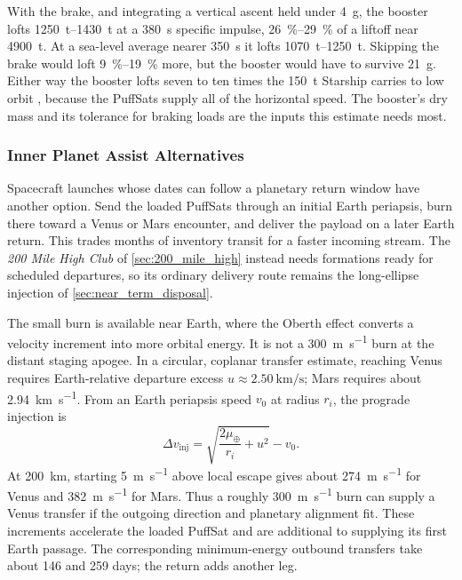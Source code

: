 \documentclass{article}
\newcommand{\deltav}{\Delta v}
\begin{document}
With the brake, and integrating a vertical ascent held under \SI{4}{g}, the booster lofts \SIrange{1250}{1430}{\tonne} at a \SI{380}{\second} specific impulse, \SIrange{26}{29}{\percent} of a liftoff near \SI{4900}{\tonne}. At a sea-level average nearer \SI{350}{\second} it lofts \SIrange{1070}{1250}{\tonne}. Skipping the brake would loft \SIrange{9}{19}{\percent} more, but the booster would have to survive \SI{21}{g}. Either way the booster lofts seven to ten times the \SI{150}{\tonne} Starship carries to low orbit \cite{gunter_starship}, because the PuffSats supply all of the horizontal speed. The booster's dry mass and its tolerance for braking loads are the inputs this estimate needs most.

\subsubsection{Inner Planet Assist Alternatives}\label{sec:inner_planet_returns}
Spacecraft launches whose dates can follow a planetary return window have another option. Send the loaded PuffSats through an initial Earth periapsis, burn there toward a Venus or Mars encounter, and deliver the payload on a later Earth return. This trades months of inventory transit for a faster incoming stream. The \emph{200 Mile High Club} of \autoref{sec:200_mile_high} instead needs formations ready for scheduled departures, so its ordinary delivery route remains the long-ellipse injection of \autoref{sec:near_term_disposal}.

The small burn is available near Earth, where the Oberth effect converts a velocity increment into more orbital energy. It is not a \SI{300}{\meter\per\second} burn at the distant staging apogee. In a circular, coplanar transfer estimate, reaching Venus requires Earth-relative departure excess $u \approx \SI{2.50}{\kilo\meter\per\second}$; Mars requires about \SI{2.94}{\kilo\meter\per\second}. From an Earth periapsis speed $v_0$ at radius $r_i$, the prograde injection is \cite{vallado_astrodynamics}
\begin{equation}
\deltav_{\mathrm{inj}} = \sqrt{\frac{2\mu_\oplus}{r_i}+u^2}-v_0.
\end{equation}
At \SI{200}{\kilo\meter}, starting \SI{5}{\meter\per\second} above local escape gives about \SI{274}{\meter\per\second} for Venus and \SI{382}{\meter\per\second} for Mars. Thus a roughly \SI{300}{\meter\per\second} burn can supply a Venus transfer if the outgoing direction and planetary alignment fit. These increments accelerate the loaded PuffSat and are additional to supplying its first Earth passage. The corresponding minimum-energy outbound transfers take about 146 and 259 days; the return adds another leg.
\end{document}
